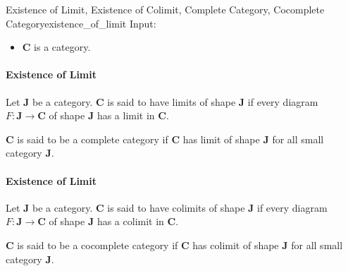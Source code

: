 \documentclass{article}
\begin{document}
\begin{definition}{Existence of Limit, Existence of Colimit, Complete Category, Cocomplete Category}{existence_of_limit}
    Input:
    \begin{itemize}
        \item $\mathbf{C}$ is a category.
    \end{itemize}
    \paragraph*{Existence of Limit}
    Let $\mathbf{J}$ be a category.
    $\mathbf{C}$ is said to have limits of shape $\mathbf{J}$ if every diagram $F:\mathbf{J}\rightarrow \mathbf{C}$ of shape $\mathbf{J}$ has a limit in $\mathbf{C}$.
    \par
    $\mathbf{C}$ is said to be a complete category if $\mathbf{C}$ has limit of shape $\mathbf{J}$ for all small category $\mathbf{J}$.
    \tcblower
    \paragraph*{Existence of Limit}
    Let $\mathbf{J}$ be a category.
    $\mathbf{C}$ is said to have colimits of shape $\mathbf{J}$ if every diagram $F:\mathbf{J}\rightarrow \mathbf{C}$ of shape $\mathbf{J}$ has a colimit in $\mathbf{C}$.
    \par
    $\mathbf{C}$ is said to be a cocomplete category if $\mathbf{C}$ has colimit of shape $\mathbf{J}$ for all small category $\mathbf{J}$.
\end{definition}
\end{document}
